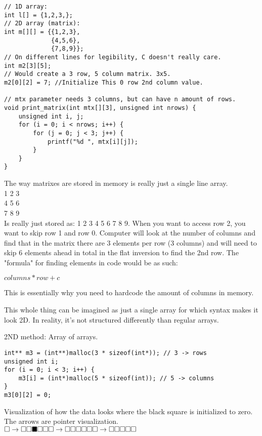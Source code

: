 \documentclass[12pt]{article}
\theoremstyle{definition}
\begin{document}
\begin{lstlisting}
// 1D array:
int l[] = {1,2,3,};
// 2D array (matrix):
int m[][] = {{1,2,3}, 
             {4,5,6}, 
             {7,8,9}};
// On different lines for legibility, C doesn't really care. 
int m2[3][5]; 
// Would create a 3 row, 5 column matrix. 3x5.
m2[0][2] = 7; //Initialize This 0 row 2nd column value. 

// mtx parameter needs 3 columns, but can have n amount of rows. 
void print_matrix(int mtx[][3], unsigned int nrows) {
    unsigned int i, j;
    for (i = 0; i < nrows; i++) {
        for (j = 0; j < 3; j++) {
            printf("%d ", mtx[i][j]);
        }    
    }
}
\end{lstlisting}
The way matrixes are stored in memory is really just a single line array. \\
1 2 3\\
4 5 6\\
7 8 9\\
Is really just stored as: 1 2 3 4 5 6 7 8 9.
When you want to access row 2, you want to skip row 1 and row 0. Computer will look at the number of columns and find that in the matrix there are 3 elements per row (3 columns) and will need to skip 6 elements ahead in total in the flat inversion to find the 2nd row. The "formula" for finding elements in code would be as such:

$columns * row + c$

This is essentially why you need to hardcode the amount of columns in memory.

This whole thing can be imagined as just a single array for which syntax makes it look 2D. In reality, it's not structured differently than regular arrays.

\note 2ND method: Array of arrays.

\begin{lstlisting}
int** m3 = (int**)malloc(3 * sizeof(int*)); // 3 -> rows
unsigned int i;
for (i = 0; i < 3; i++) {
    m3[i] = (int*)malloc(5 * sizeof(int)); // 5 -> columns
}
m3[0][2] = 0;
\end{lstlisting}
Visualization of how the data looks where the black square is initialized to zero. The arrows are pointer visualization. \\
$\square \rightarrow \square \square \blacksquare \square \square \\\square \rightarrow \square \square \square \square \square \\\square \rightarrow \square \square \square \square \square $
\end{document}
